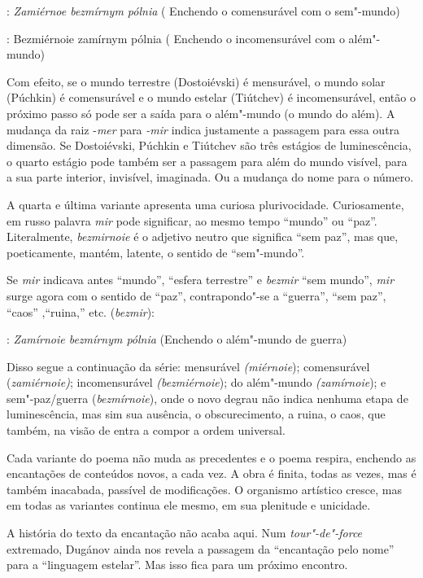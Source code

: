  : \emph{Zamiérnoe bezmírnym pólnia} ( Enchendo o comensurável com o
sem"-mundo)

 : Bezmiérnoie zamírnym pólnia ( Enchendo o incomensurável com o
além"-mundo)

Com efeito, se o mundo terrestre (Dostoiévski) é mensurável, o mundo
solar (Púchkin) é comensurável e o mundo estelar (Tiútchev) é
incomensurável, então o próximo passo só pode ser a saída para o
além"-mundo (o mundo do além). A mudança da raiz -\emph{mer} para
\emph{-mir} indica justamente a passagem para essa outra dimensão. Se
Dostoiévski, Púchkin e Tiútchev são três estágios de luminescência, o
quarto estágio pode também ser a passagem para além do mundo visível,
para a sua parte interior, invisível, imaginada. Ou a mudança do nome
para o número.

A quarta e última variante apresenta uma curiosa plurivocidade.
Curiosamente, em russo palavra \emph{mir} pode significar, ao mesmo
tempo ``mundo'' ou ``paz''. Literalmente, \emph{bezmirnoie} é o adjetivo
neutro que significa ``sem paz'', mas que, poeticamente, mantém,
latente, o sentido de ``sem"-mundo''.

Se \emph{mir} indicava antes ``mundo'', ``esfera terrestre'' e
\emph{bezmir} ``sem mundo'', \emph{mir} surge agora com o sentido de
``paz'', contrapondo"-se a ``guerra'', ``sem paz'', ``caos'' ,``ruina,''
etc. (\emph{bezmir}):

: \emph{Zamírnoie bezmírnym pólnia} (Enchendo o além"-mundo de guerra)

Disso segue a continuação da série: mensurável \emph{(miérnoie});
comensurável (\emph{zamiérnoie)}; incomensurável \emph{(bezmiérnoie});
do além"-mundo \emph{(zamírnoie}); e sem"-paz/guerra (\emph{bezmírnoie}),
onde o novo degrau não indica nenhuma etapa de luminescência, mas sim
sua ausência, o obscurecimento, a ruina, o caos, que também, na visão de
 entra a compor a ordem universal.

Cada variante do poema não muda as precedentes e o poema respira,
enchendo as encantações de conteúdos novos, a cada vez. A obra é finita,
todas as vezes, mas é também inacabada, passível de modificações. O
organismo artístico cresce, mas em todas as variantes continua ele
mesmo, em sua plenitude e unicidade.

A história do texto da encantação não acaba aqui. Num
\emph{tour"-de"-force} extremado, Dugánov ainda nos revela a passagem da
``encantação pelo nome'' para a ``linguagem estelar''. Mas isso fica
para um próximo encontro.

